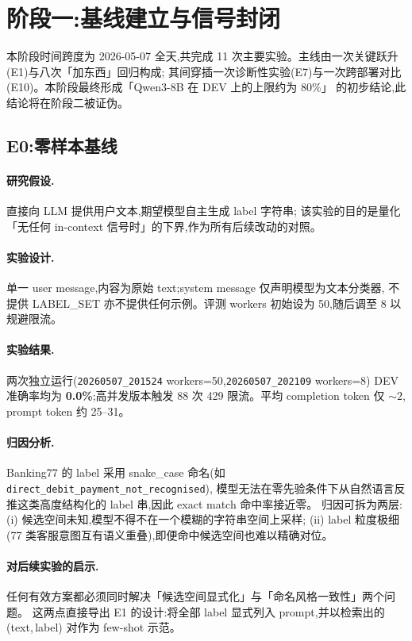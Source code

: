 \documentclass[11pt,a4paper]{ctexart}
\begin{document}
\section{阶段一:基线建立与信号封闭}\label{sec:phase1}

本阶段时间跨度为 2026-05-07 全天,共完成 11 次主要实验。主线由一次关键跃升(E1)与八次「加东西」回归构成;
其间穿插一次诊断性实验(E7)与一次跨部署对比(E10)。本阶段最终形成「Qwen3-8B 在 DEV 上的上限约为 80\%」
的初步结论,此结论将在阶段二被证伪。

\subsection{E0:零样本基线}

\paragraph{研究假设.}直接向 LLM 提供用户文本,期望模型自主生成 label 字符串;
该实验的目的是量化「无任何 in-context 信号时」的下界,作为所有后续改动的对照。

\paragraph{实验设计.}单一 user message,内容为原始 text;system message 仅声明模型为文本分类器,
不提供 LABEL\_SET 亦不提供任何示例。评测 workers 初始设为 50,随后调至 8 以规避限流。

\paragraph{实验结果.}两次独立运行(\texttt{20260507\_201524} workers=50,\texttt{20260507\_202109} workers=8)
DEV 准确率均为 \textbf{0.0\%};高并发版本触发 88 次 429 限流。平均 completion token 仅 $\sim 2$,
prompt token 约 25--31。

\paragraph{归因分析.}Banking77 的 label 采用 snake\_case 命名(如 \texttt{direct\_debit\_payment\_not\_recognised}),
模型无法在零先验条件下从自然语言反推这类高度结构化的 label 串,因此 exact match 命中率接近零。
归因可拆为两层:(i) 候选空间未知,模型不得不在一个模糊的字符串空间上采样;
(ii) label 粒度极细(77 类客服意图互有语义重叠),即便命中候选空间也难以精确对位。

\paragraph{对后续实验的启示.}任何有效方案都必须同时解决「候选空间显式化」与「命名风格一致性」两个问题。
这两点直接导出 E1 的设计:将全部 label 显式列入 prompt,并以检索出的 (text,\,label) 对作为 few-shot 示范。
\end{document}
